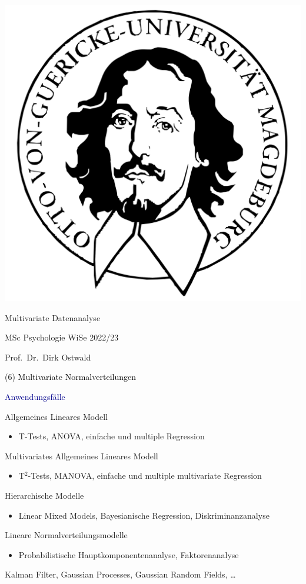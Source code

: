\documentclass[
  8pt,
  ignorenonframetext,
]{beamer}
\author{}
\date{\vspace{-2.5em}}
\providecommand{\tightlist}{%
  \setlength{\itemsep}{0pt}\setlength{\parskip}{0pt}}
\begin{document}
\begin{frame}[plain]{}
\protect\hypertarget{section}{}
\center

\begin{center}\includegraphics[width=0.2\linewidth]{6_Abbildungen/mvda_6_otto} \end{center}

\vspace{2mm}

\Huge

Multivariate Datenanalyse \vspace{6mm}

\large

MSc Psychologie WiSe 2022/23

\vspace{6mm}
\large

Prof.~Dr.~Dirk Ostwald
\end{frame}

\begin{frame}[plain]{}
\protect\hypertarget{section-1}{}
\vfill
\center
\huge

\textcolor{black}{(6) Multivariate Normalverteilungen} \vfill
\end{frame}

\begin{frame}{}
\protect\hypertarget{section-2}{}

\textcolor{darkblue}{Anwendungsfälle}

\small

Allgemeines Lineares Modell

\begin{itemize}
\tightlist
\item
  T-Tests, ANOVA, einfache und multiple Regression
\end{itemize}

Multivariates Allgemeines Lineares Modell

\begin{itemize}
\tightlist
\item
  T\(^2\)-Tests, MANOVA, einfache und multiple multivariate Regression
\end{itemize}

Hierarchische Modelle

\begin{itemize}
\tightlist
\item
  Linear Mixed Models, Bayesianische Regression, Diskriminanzanalyse
\end{itemize}

Lineare Normalverteilungsmodelle

\begin{itemize}
\tightlist
\item
  Probabilistische Hauptkomponentenanalyse, Faktorenanalyse
\end{itemize}

Kalman Filter, Gaussian Processes, Gaussian Random Fields, \ldots{}
\end{frame}
\end{document}
